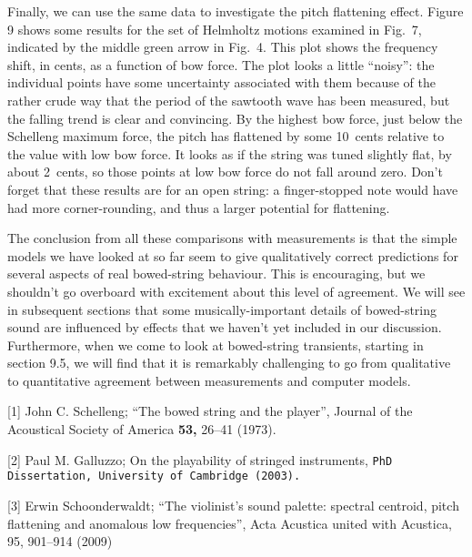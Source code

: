   Finally, we can use the same data to investigate the pitch flattening effect. 
  Figure 9 shows some results for the set of Helmholtz motions examined in 
  Fig.\ 7, indicated by the middle green arrow in Fig.\ 4. This plot shows the 
  frequency shift, in cents, as a function of bow force. The plot looks a 
  little “noisy”: the individual points have some uncertainty associated with 
  them because of the rather crude way that the period of the sawtooth wave has 
  been measured, but the falling trend is clear and convincing. By the highest 
  bow force, just below the Schelleng maximum force, the pitch has flattened by 
  some 10~cents relative to the value with low bow force. It looks as if the 
  string was tuned slightly flat, by about 2~cents, so those points at low bow 
  force do not fall around zero. Don’t forget that these results are for an 
  open string: a finger-stopped note would have had more corner-rounding, and 
  thus a larger potential for flattening. 

  The conclusion from all these comparisons with measurements is that the 
  simple models we have looked at so far seem to give qualitatively correct 
  predictions for several aspects of real bowed-string behaviour. This is 
  encouraging, but we shouldn’t go overboard with excitement about this level 
  of agreement. We will see in subsequent sections that some 
  musically-important details of bowed-string sound are influenced by effects 
  that we haven’t yet included in our discussion. Furthermore, when we come to 
  look at bowed-string transients, starting in section 9.5, we will find that 
  it is remarkably challenging to go from qualitative to quantitative agreement 
  between measurements and computer models. 



  \sectionreferences{}[1] John C. Schelleng; ``The bowed string and the 
  player'', Journal of the Acoustical Society of America \textbf{53, }26–41 
  (1973). 

  [2] Paul M. Galluzzo; On the playability of stringed instruments, \tt{}PhD 
  Dissertation\rm{}, University of Cambridge (2003). 

  [3] Erwin Schoonderwaldt; ``The violinist’s sound palette: spectral centroid, 
  pitch flattening and anomalous low frequencies'', Acta Acustica united with 
  Acustica, 95, 901--914 (2009) 